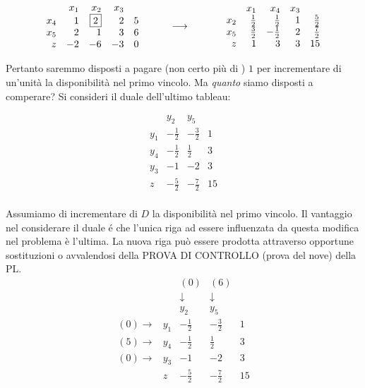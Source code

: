 \documentclass[10pt]{article}
\begin{document}
\[
   \begin{array}{rrrrr}
         & x_1  & x_2 & x_3  \\
      x_4 &  1 &  \fbox{$2$}  &  2 &  5 \\
      x_5 &  2 &  1  &  3 &  6 \\
       z  & -2 & -6  & -3 &  0 \\
   \end{array}
\hfill
\hspace{1cm}
{\longrightarrow}
\hfill
\hspace{1.2cm}
   \begin{array}{rrrrr}
         & x_1  & x_4 & x_3  \\
      x_2 & \frac{1}{2} &  \frac{1}{2} &  1  & \frac{5}{2} \\
      x_5 & \frac{3}{2} & -\frac{1}{2} &  2  & \frac{7}{2} \\
       z  &          1  &           3  &  3  & 15 \\
   \end{array}
\]

Pertanto saremmo disposti a pagare (non certo pi\`u di ) $1$
per incrementare di un'unit\`a la disponibilit\`a
nel primo vincolo.
Ma {\em quanto} siamo disposti a comperare?
Si consideri il duale dell'ultimo tableau:

\[
   \begin{array}{rrrr}
         & y_2  & y_5  \\
      y_1 &  -\frac{1}{2} & -\frac{3}{2} &  1 \\
      y_4 &  -\frac{1}{2} &  \frac{1}{2} &  3 \\
      y_3 &  -1 &  -2 &  3 \\
       z  &  -\frac{5}{2} & -\frac{7}{2} & 15 \\
   \end{array}
\]

Assumiamo di incrementare di $D$ 
la disponibilit\`a nel primo vincolo.
Il vantaggio nel considerare il duale \'e
che l'unica riga ad essere influenzata da questa
modifica nel problema \`e l'ultima.
La nuova riga pu\`o essere prodotta 
attraverso opportune sostituzioni o 
avvalendosi della PROVA DI CONTROLLO (prova del nove) della PL.\\


\[
   \begin{array}{rrrrr}
       &  & (0)  & (6) \\
       &  & \downarrow \;& \downarrow \;\\
       &  & y_2  & y_5  \\
    (0) \rightarrow & y_1 &  -\frac{1}{2} & -\frac{3}{2} &  1 \\
    (5) \rightarrow & y_4 &  -\frac{1}{2} &  \frac{1}{2} &  3 \\
    (0) \rightarrow & y_3 &  -1 &  -2 &  3 \\
       & z  &  -\frac{5}{2} & -\frac{7}{2} & 15 \\
   \end{array}
\]
\end{document}
